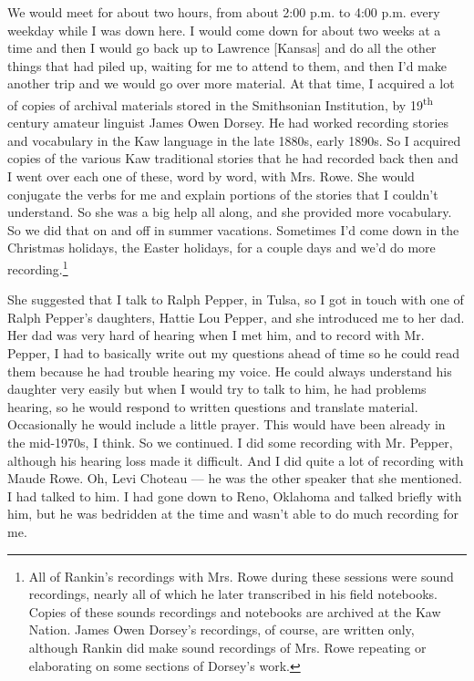 \documentclass[output=paper]{LSP/langsci}
\begin{document}
We would meet for about two hours, from about 2:00 p.m. to 4:00 p.m. every weekday while I was down here. I would come down for about two weeks at a time and then I would go back up to Lawrence [Kansas] and do all the other things that had piled up, waiting for me to attend to them, and then I'd make another trip and we would go over more material. At that time, I acquired a lot of copies of archival materials stored in the Smithsonian Institution, by 19\textsuperscript{th} century amateur linguist James Owen Dorsey. He had worked recording stories and vocabulary in the Kaw language in the late 1880s, early 1890s. So I acquired copies of the various Kaw traditional stories that he had recorded back then and I went over each one of these, word by word, with Mrs. Rowe. She would conjugate the verbs for me and explain portions of the stories that I couldn't understand. So she was a big help all along, and she provided more vocabulary. So we did that on and off in summer vacations. Sometimes I'd come down in the Christmas holidays, the Easter holidays, for a couple days and we'd do more recording.\footnote{All of Rankin's recordings with Mrs. Rowe during these sessions were sound recordings, nearly all of which he later transcribed in his field notebooks. Copies of these sounds recordings and notebooks are archived at the Kaw Nation. James Owen Dorsey's recordings, of course, are written only, although Rankin did make sound recordings of Mrs. Rowe repeating or elaborating on some sections of Dorsey's work.}

She suggested that I talk to Ralph Pepper, in Tulsa, so I got in touch with one of Ralph Pepper's daughters, Hattie Lou Pepper, and she introduced me to her dad. Her dad was very hard of hearing when I met him, and to record with Mr. Pepper, I had to basically write out my questions ahead of time so he could read them because he had trouble hearing my voice. He could always understand his daughter very easily but when I would try to talk to him, he had problems hearing, so he would respond to written questions and translate material. Occasionally he would include a little prayer. This would have been already in the mid-1970s, I think. So we continued. I did some recording with Mr. Pepper, although his hearing loss made it difficult. And I did quite a lot of recording with Maude Rowe. Oh, Levi Choteau --- he was the other speaker that she mentioned. I had talked to him. I had gone down to Reno, Oklahoma and talked briefly with him, but he was bedridden at the time and wasn't able to do much recording for me.
\end{document}
